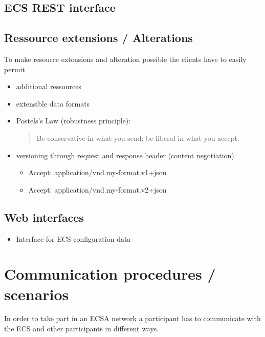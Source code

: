 \subsection{ECS REST interface}

\subsection{Ressource extensions / Alterations}
To make resource extensions and alteration possible the clients have to
easily permit  
\begin{itemize}
  \item additional ressources
  \item extensible data formats
  \item Postels's Law (robustness principle):\begin{quote}Be conservative in what you send; be liberal in what you accept.\end{quote}
  \item versioning through request and response header (content negotiation)
  \begin{itemize}
    \item Accept: application/vnd.my-format.v1+json
    \item Accept: application/vnd.my-format.v2+json
  \end{itemize}
\end{itemize}

\subsection{Web interfaces}
\begin{itemize}
  \item Interface for ECS configuration data 
\end{itemize}

\hypertarget{parcomproc}{}
\section{Communication procedures / scenarios}
In order to take part in an ECSA network a participant has to communicate with
the ECS and other participants in different ways.

